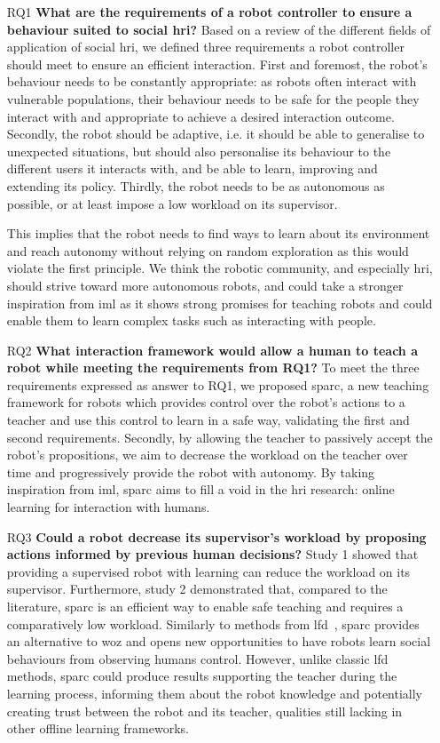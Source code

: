 \begin{itemize}
	\item [RQ1] \textbf{What are the requirements of a robot controller to ensure a behaviour suited to social \gls{hri}?} 
	Based on a review of the different fields of application of social \gls{hri}, we defined three requirements a robot controller should meet to ensure an efficient interaction. First and foremost, the robot's behaviour needs to be constantly appropriate: as robots often interact with vulnerable populations, their behaviour needs to be safe for the people they interact with and appropriate to achieve a desired interaction outcome. Secondly, the robot should be adaptive, i.e. it should be able to generalise to unexpected situations, but should also personalise its behaviour to the different users it interacts with, and be able to learn, improving and extending its policy. Thirdly, the robot needs to be as autonomous as possible, or at least impose a low workload on its supervisor.
	
	This implies that the robot needs to find ways to learn about its environment and reach autonomy without relying on random exploration as this would violate the first principle. We think the robotic community, and especially \gls{hri}, should strive toward more autonomous robots, and could take a stronger inspiration from \gls{iml} as it shows strong promises for teaching robots and could enable them to learn complex tasks such as interacting with people.
	
	\item [RQ2] \textbf{What interaction framework would allow a human to teach a robot while meeting the requirements from RQ1?}
	To meet the three requirements expressed as answer to RQ1, we proposed \gls{sparc}, a new teaching framework for robots which provides control over the robot's actions to a teacher and use this control to learn in a safe way, validating the first and second requirements. Secondly, by allowing the teacher to passively accept the robot's propositions, we aim to decrease the workload on the teacher over time and progressively provide the robot with autonomy. By taking inspiration from \gls{iml}, \gls{sparc} aims to fill a void in the \gls{hri} research: online learning for interaction with humans.
	
	\item [RQ3] \textbf{Could a robot decrease its supervisor's workload by proposing actions informed by previous human decisions?}
	Study 1 showed that providing a supervised robot with learning can reduce the workload on its supervisor. Furthermore, study 2 demonstrated that, compared to the literature, \gls{sparc} is an efficient way to enable safe teaching and requires a comparatively low workload. Similarly to methods from \gls{lfd}~\citep{liu2014train,sequeira2016discovering}, \gls{sparc} provides an alternative to \gls{woz} and opens new opportunities to have robots learn social behaviours from observing humans control. However, unlike classic \gls{lfd} methods, \gls{sparc} could produce results supporting the teacher during the learning process, informing them about the robot knowledge and potentially creating trust between the robot and its teacher, qualities still lacking in other offline learning frameworks.
	

\end{itemize}
